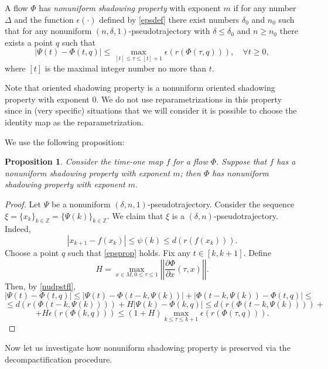 \documentclass[11pt]{article}
\newcounter{razdel}[section]
\theoremstyle{Mystyle}
\newtheorem{Proposition}[razdel]{Proposition}
\begin{document}
A flow $\Phi$ has \textit{nonuniform shadowing property} with exponent $m$ if for any number $\Delta$ and the function $\epsilon(\cdot)$ defined by \eqref{epsdef} 
there exist numbers $\delta_0$ and $n_0$ such that for 
any nonuniform $(n,\delta,1)$-pseudotrajectory with $\delta\leq\delta_0$ and $n\geq n_0$ 
there exists a point $q$ such that
$$|\Psi(t) - \Phi(t,q)|\leq \max_{[t]\leq \tau\leq [t]+1}\epsilon(r(\Phi(\tau,q))),\quad\forall t\geq0,$$
where $[t]$ is the maximal integer number no more than $t$.

Note that oriented shadowing property is a nonuniform oriented shadowing property with exponent $0$.
We do not use reparametrizations in this property since in (very specific) situations that we will consider it is possible to choose the identity map as the reparametrization.

We use the following proposition:
\begin{Proposition}
\label{PropA}
Consider the time-one map $f$ for a flow $\Phi$. Suppose that $f$ has a nonuniform shadowing property with exponent $m$; then $\Phi$ has nonuniform shadowing property with exponent $m$.
\end{Proposition}

\begin{proof}
Let $\Psi$ be a nonuniform $(\delta,n,1)$-pseudotrajectory. Consider the sequence 
$\xi=\{x_k\}_{k\in\mathbb{Z}} = \{\Psi(k)\}_{k\in\mathbb{Z}}$. We claim that $\xi$ is a $(\delta, n)$-pseudotrajectory. Indeed, 
$$|x_{k+1}-f(x_k)|\leq \psi(k)\leq d(r(f(x_k))).$$
Choose a point $q$ such that \eqref{epsprop} holds. Fix any $t\in [k,k+1]$. Define
$$H=\max_{x\in M, 0\leq \tau\leq 1} \left|\left|\frac{\partial\Phi}{\partial x}(\tau, x)\right|\right|.$$
Then, by \eqref{nudpstfl},
$$|\Psi(t) - \Phi(t,q)|\leq |\Psi(t) - \Phi(t-k,\Psi(k))| + |\Phi(t-k,\Psi(k)) - \Phi(t,q)|
\leq$$ 
$$\leq d(r(\Phi(t-k,\Psi(k)))) + H|\Psi(k) - \Phi(k,q)| \leq  d(r(\Phi(t-k,\Psi(k)))) + $$ 
$$ + H\epsilon(r(\Phi(k,q)))\leq (1+H)\max_{k\leq\tau\leq k+1}\epsilon(r(\Phi(\tau,q))).$$
\end{proof}

Now let us investigate how nonuniform shadowing property is preserved via the decompactification procedure.
\end{document}
